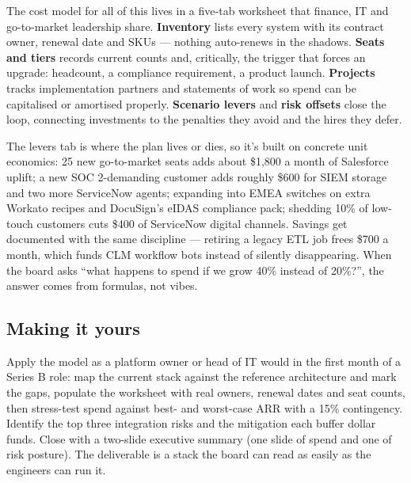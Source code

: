 The cost model for all of this lives in a five-tab worksheet that finance, IT and go-to-market leadership share. \textbf{Inventory} lists every system with its contract owner, renewal date and SKUs — nothing auto-renews in the shadows. \textbf{Seats and tiers} records current counts and, critically, the trigger that forces an upgrade: headcount, a compliance requirement, a product launch. \textbf{Projects} tracks implementation partners and statements of work so spend can be capitalised or amortised properly. \textbf{Scenario levers} and \textbf{risk offsets} close the loop, connecting investments to the penalties they avoid and the hires they defer.


The levers tab is where the plan lives or dies, so it's built on concrete unit economics: 25 new go-to-market seats adds about \$1,800 a month of Salesforce uplift; a new SOC 2-demanding customer adds roughly \$600 for SIEM storage and two more ServiceNow agents; expanding into EMEA switches on extra Workato recipes and DocuSign's eIDAS compliance pack; shedding 10\% of low-touch customers cuts \$400 of ServiceNow digital channels. Savings get documented with the same discipline — retiring a legacy ETL job frees \$700 a month, which funds CLM workflow bots instead of silently disappearing. When the board asks ``what happens to spend if we grow 40\% instead of 20\%?'', the answer comes from formulas, not vibes.



\subsection{Making it yours}


Apply the model as a platform owner or head of IT would in the first month of a Series B role: map the current stack against the reference architecture and mark the gaps, populate the worksheet with real owners, renewal dates and seat counts, then stress-test spend against best- and worst-case ARR with a 15\% contingency. Identify the top three integration risks and the mitigation each buffer dollar funds. Close with a two-slide executive summary (one slide of spend and one of risk posture). The deliverable is a stack the board can read as easily as the engineers can run it.

